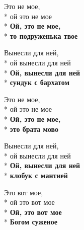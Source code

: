 \medskip

\begin{minipage}{\linewidth}
Это не мое,\\*
ой это не мое\\*
\textbf{Ой, это не мое,}\\*
\textbf{то подруженька твое}\\
\end{minipage}\par\medskip\nobreak

\medskip

\begin{minipage}{\linewidth}
Вынесли для ней,\\*
ой вынесли для ней\\*
\textbf{Ой, вынесли для ней}\\*
\textbf{сундук с бархатом}\\
\end{minipage}\par\medskip\nobreak

\medskip

\begin{minipage}{\linewidth}
Это не мое,\\*
ой это не мое\\*
\textbf{Ой, это не мое,}\\*
\textbf{это брата мово}\\
\end{minipage}\par\medskip\nobreak

\medskip

\begin{minipage}{\linewidth}
Вынесли для ней,\\*
ой вынесли для ней\\*
\textbf{Ой, вынесли для ней}\\*
\textbf{клобук с мантией}\\
\end{minipage}\par\medskip\nobreak

\medskip

\begin{minipage}{\linewidth}
Это вот мое,\\*
ой это вот мое\\*
\textbf{Ой, это вот мое}\\*
\textbf{Богом суженое}\\
\end{minipage}\par\medskip\nobreak

